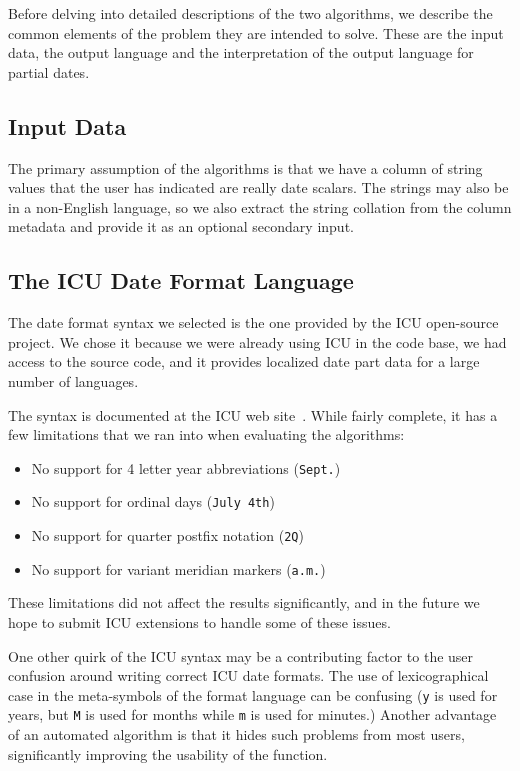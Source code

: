 Before delving into detailed descriptions of the two algorithms, we describe the common elements of the problem they are intended to solve. These are the input data, the output language and the interpretation of the output language for partial dates.

\subsection{Input Data}
The primary assumption of the algorithms is that we have a column of string values that the user has indicated are really date scalars. The strings may also be in a non-English language, so we also extract the string collation from the column metadata and provide it as an optional secondary input.

\subsection{The ICU Date Format Language}
The date format syntax we selected is the one provided by the ICU open-source project. We chose it because we were already using ICU in the code base, we had access to the source code, and it provides localized date part data for a large number of languages.

The syntax is documented at the ICU web site~\cite{ICU}. While fairly complete, it has a few limitations that we ran into when evaluating the algorithms:
\begin{itemize}
\item No support for 4 letter year abbreviations (\eg \texttt{Sept.})
\item No support for ordinal days (\eg \texttt{July 4th})
\item No support for quarter postfix notation (\eg \texttt{2Q})
\item No support for variant meridian markers (\eg \texttt{a.m.})
\end{itemize}

These limitations did not affect the results significantly, and in the future we hope to submit ICU extensions to handle some of these issues.

One other quirk of the ICU syntax may be a contributing factor to the user confusion around writing correct ICU date formats. The use of lexicographical case in the meta-symbols of the format language can be confusing (\eg \texttt{y} is used for years, but \texttt{M} is used for months while \texttt{m} is used for minutes.) Another advantage of an automated algorithm is that it hides such problems from most users, significantly improving the usability of the function.

